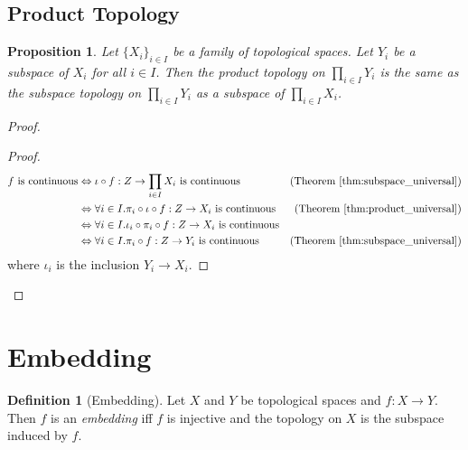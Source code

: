 \documentclass{book}
\let\qed\relax
\newtheorem{prop}[ax]{Proposition}
\theoremstyle{definition}
\newtheorem{df}[ax]{Definition}
\begin{document}
\subsection{Product Topology}

\begin{prop}
Let $\{X_i\}_{i \in I}$ be a family of topological spaces. Let $Y_i$ be a subspace of $X_i$ for all $i \in I$. Then the product topology on $\prod_{i \in I} Y_i$ is the same as the subspace topology on $\prod_{i \in I} Y_i$ as a subspace of $\prod_{i \in I} X_i$.
\end{prop}

\begin{proof}
\pf
{}
\begin{proof}
	\pf
	\begin{align*}
		f \text{ is continuous}
		& \Leftrightarrow \iota \circ f : Z \rightarrow \prod_{i \in I} X_i \text{ is continuous} & (\text{Theorem \ref{thm:subspace_universal}}) \\
		& \Leftrightarrow \forall i \in I. \pi_i \circ \iota \circ f : Z \rightarrow X_i \text{ is continuous} & (\text{Theorem \ref{thm:product_universal}}) \\
		& \Leftrightarrow \forall i \in I. \iota_i \circ \pi_i \circ f : Z \rightarrow X_i \text{ is continuous} \\
		& \Leftrightarrow \forall i \in I. \pi_i \circ f : Z \rightarrow Y_i \text{ is continuous}
		& (\text{Theorem \ref{thm:subspace_universal}})
	\end{align*}
	where $\iota_i$ is the inclusion $Y_i \rightarrow X_i$.
\end{proof}
\qed
\end{proof}

\section{Embedding}

\begin{df}[Embedding]
Let $X$ and $Y$ be topological spaces and $f : X \rightarrow Y$. Then $f$ is an \emph{embedding} iff $f$ is injective and the topology on $X$ is the subspace induced by $f$.
\end{df}
\end{document}
